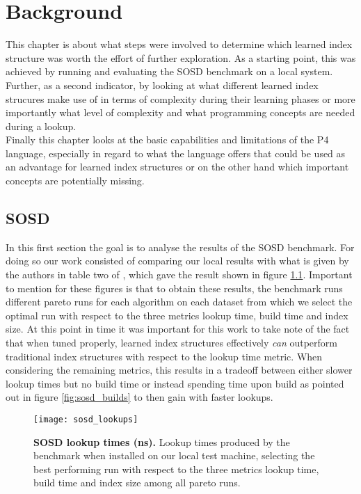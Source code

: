 
\chapter{Background}
\label{ch:background}
This chapter is about what steps were involved to determine which learned index structure was worth the effort of further exploration. As a starting point, this was achieved by running and evaluating the SOSD benchmark \cite{sosd-neurips} on a local system. Further, as a second indicator, by looking at what different learned index strucures make use of in terms of complexity during their learning phases or more importantly what level of complexity and what programming concepts are needed during a lookup.\\

Finally this chapter looks at the basic capabilities and limitations of the P4 language, especially in regard to what the language offers that could be used as an advantage for learned index structures or on the other hand which important concepts are potentially missing.

\section{SOSD}
In this first section the goal is to analyse the results of the SOSD benchmark. For doing so our work consisted of comparing our local results with what is given by the authors in table two of \cite{sosd-neurips}, which gave the result shown in figure \ref{fig:sosd_lookups}. Important to mention for these figures is that to obtain these results, the benchmark runs different pareto runs for each algorithm on each dataset from which we select the optimal run with respect to the three metrics lookup time, build time and index size. At this point in time it was important for this work to take note of the fact that when tuned properly, learned index structures effectively \emph{can} outperform traditional index structures with respect to the lookup time metric. When considering the remaining metrics, this results in a tradeoff between either slower lookup times but no build time or instead spending time upon build as pointed out in figure \ref{fig:sosd_builds} to then gain with faster lookups.

\begin{figure}[!ht]
\centering
\texttt{[image: sosd\_lookups]}
\caption[SOSD Lookups]{
  \textbf{SOSD lookup times (ns).}
  Lookup times produced by the benchmark when installed on our local test machine, selecting the best performing run with respect to the three metrics lookup time, build time and index size among all pareto runs.
}
\label{fig:sosd_lookups}
\end{figure}

